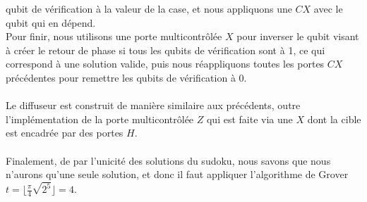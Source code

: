 qubit de vérification à la valeur de la case, et nous appliquons une $CX$ avec le qubit
qui en dépend.\\
Pour finir, nous utilisons une porte multicontrôlée $X$ pour inverser le qubit visant à créer
le retour de phase si tous les qubits de vérification sont à 1, ce qui correspond à une solution
valide, puis nous réappliquons toutes les portes $CX$ précédentes pour remettre les qubits
de vérification à 0.\\ \\
Le diffuseur est construit de manière similaire aux précédents, outre l'implémentation de
la porte multicontrôlée $Z$ qui est faite via une $X$ dont la cible est encadrée par des
portes $H$.\\ \\
Finalement, de par l'unicité des solutions du sudoku, nous savons que nous n'aurons qu'une
seule solution, et donc il faut appliquer l'algorithme de Grover $t = \lfloor \frac{\pi}{4} \sqrt{2^5} \rfloor = 4$.
